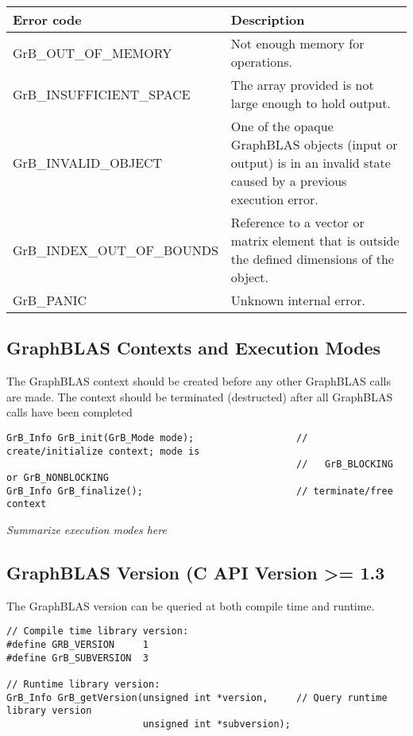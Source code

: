 \documentclass[11pt]{article}
\begin{document}
\begin{tabular}{l|p{4.5in}} \hline
Error code	& Description \\ \hline
{\sf GrB\_OUT\_OF\_MEMORY}         & Not enough memory for operations. \\
{\sf GrB\_INSUFFICIENT\_SPACE}     & The array provided is not large enough to hold output. \\
{\sf GrB\_INVALID\_OBJECT}         & One of the opaque GraphBLAS objects (input or output) is in an invalid state caused by a previous execution error. \\
{\sf GrB\_INDEX\_OUT\_OF\_BOUNDS}  & Reference to a vector or matrix element that is outside the defined dimensions of the object. \\
{\sf GrB\_PANIC}		& Unknown internal error. \\ \hline
\end{tabular}

\subsection{GraphBLAS Contexts and Execution Modes}

The GraphBLAS context should be created before any other GraphBLAS calls are made. The
context should be terminated (destructed) after all GraphBLAS calls have been completed

\begin{verbatim}
GrB_Info GrB_init(GrB_Mode mode);                  // create/initialize context; mode is
                                                   //   GrB_BLOCKING or GrB_NONBLOCKING
GrB_Info GrB_finalize();                           // terminate/free context
\end{verbatim}

{\em Summarize execution modes here}

\subsection{GraphBLAS Version (C API Version >= 1.3}

The GraphBLAS version can be queried at both compile time and runtime.

\begin{verbatim}
// Compile time library version:
#define GRB_VERSION     1
#define GrB_SUBVERSION  3

// Runtime library version:
GrB_Info GrB_getVersion(unsigned int *version,     // Query runtime library version
                        unsigned int *subversion);
\end{verbatim}
\end{document}
